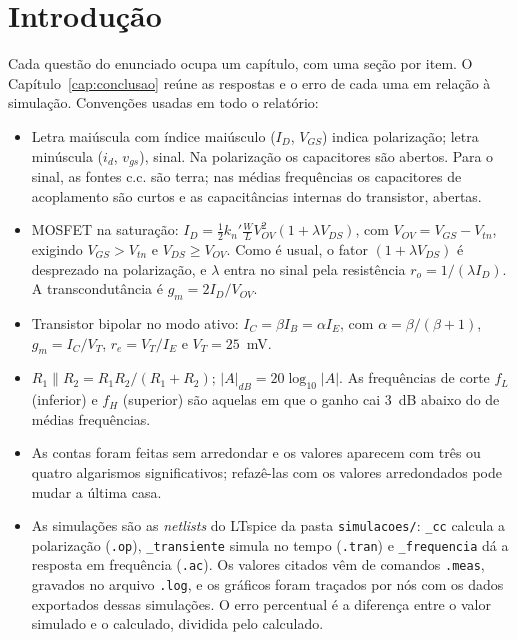 \documentclass[12pt,a4paper]{report}
\begin{document}
\renewcommand{\today}{12 de outubro de 2026}

\hypersetup{pageanchor=false}
\maketitlepage
\hypersetup{pageanchor=true}
\pagestyle{IHA-fancy-plain}

\tableofcontents
\listoffigures

\chapter*{Introdução}

Cada questão do enunciado ocupa um capítulo, com uma seção por item. O Capítulo~\ref{cap:conclusao} reúne as respostas e o erro de cada uma em relação à simulação. Convenções usadas em todo o relatório:
\begin{itemize}
    \item Letra maiúscula com índice maiúsculo ($I_D$, $V_{GS}$) indica polarização; letra minúscula ($i_d$, $v_{gs}$), sinal. Na polarização os capacitores são abertos. Para o sinal, as fontes c.c. são terra; nas médias frequências os capacitores de acoplamento são curtos e as capacitâncias internas do transistor, abertas.
    \item MOSFET na saturação: $I_D = \tfrac12 k_n'\tfrac{W}{L}V_{OV}^2(1+\lambda V_{DS})$, com $V_{OV} = V_{GS}-V_{tn}$, exigindo $V_{GS} > V_{tn}$ e $V_{DS}\geq V_{OV}$. Como é usual, o fator $(1+\lambda V_{DS})$ é desprezado na polarização, e $\lambda$ entra no sinal pela resistência $r_o = 1/(\lambda I_D)$. A transcondutância é $g_m = 2I_D/V_{OV}$.
    \item Transistor bipolar no modo ativo: $I_C = \beta I_B = \alpha I_E$, com $\alpha = \beta/(\beta+1)$, $g_m = I_C/V_T$, $r_e = V_T/I_E$ e $V_T = 25$~mV.
    \item $R_1\parallel R_2 = R_1R_2/(R_1+R_2)$; $|A|_{dB} = 20\log_{10}|A|$. As frequências de corte $f_L$ (inferior) e $f_H$ (superior) são aquelas em que o ganho cai 3~dB abaixo do de médias frequências.
    \item As contas foram feitas sem arredondar e os valores aparecem com três ou quatro algarismos significativos; refazê-las com os valores arredondados pode mudar a última casa.
    \item As simulações são as \textit{netlists} do LTspice da pasta \texttt{simulacoes/}: \texttt{\_cc} calcula a polarização (\texttt{.op}), \texttt{\_transiente} simula no tempo (\texttt{.tran}) e \texttt{\_frequencia} dá a resposta em frequência (\texttt{.ac}). Os valores citados vêm de comandos \texttt{.meas}, gravados no arquivo \texttt{.log}, e os gráficos foram traçados por nós com os dados exportados dessas simulações. O erro percentual é a diferença entre o valor simulado e o calculado, dividida pelo calculado.
\end{itemize}
\end{document}
